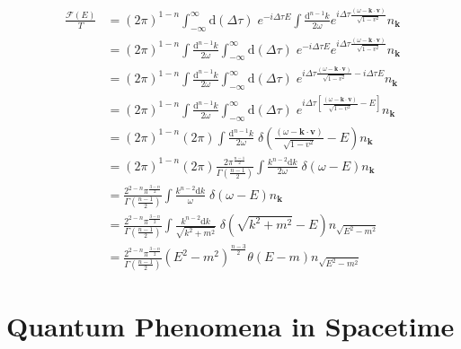 \documentclass[12pt]{article}
\numberwithin{equation}{subsection}
\theoremstyle{mystyle}{\newtheorem{definition}{Definition}[subsection]}
\theoremstyle{mystyle}{\newtheorem{theorem}[definition]{Theorem}}
\theoremstyle{mystyle}{\newtheorem*{remark}{Remark}}
\theoremstyle{mystyle}{\newtheorem{example}{Example}[subsection]}
\theoremstyle{mystyle}{\newtheorem{examples}{Examples}[subsection]}
\theoremstyle{mystyle}{\newtheorem{cthm}{}[subsection]}
\newcommand{\id}{\mathrm{d}}
\begin{document}
\begin{align}
  \frac{\mathcal{F}(E)}{T} & = (2\pi)^{1-n}\int^{\infty}_{-\infty}\id (\Delta \tau)\;e^{-i\Delta\tau E}
  \int\frac{\id^{n-1}k}{2\omega}e^{i\Delta\tau\frac{(\omega-\mathbf{k}\cdot\mathbf{v})}{\sqrt{1-v^2}}}n_{\mathbf{k}}        \\
                 & = (2\pi)^{1-n}\int\frac{\id^{n-1}k}{2\omega}\int^{\infty}_{-\infty}\id (\Delta \tau)\;e^{-i\Delta\tau E}
  e^{i\Delta\tau\frac{(\omega-\mathbf{k}\cdot\mathbf{v})}{\sqrt{1-v^2}}}n_{\mathbf{k}}                                      \\
                 & = (2\pi)^{1-n}\int\frac{\id^{n-1}k}{2\omega}\int^{\infty}_{-\infty}\id (\Delta \tau)\;
  e^{i\Delta\tau\frac{(\omega-\mathbf{k}\cdot\mathbf{v})}{\sqrt{1-v^2}}-i\Delta\tau E}n_{\mathbf{k}}                        \\
                 & = (2\pi)^{1-n}\int\frac{\id^{n-1}k}{2\omega}\int^{\infty}_{-\infty}\id (\Delta \tau)\;
  e^{i\Delta\tau\left[\frac{(\omega-\mathbf{k}\cdot\mathbf{v})}{\sqrt{1-v^2}}-E\right]}n_{\mathbf{k}}                       \\
                 & = (2\pi)^{1-n}(2\pi)\int\frac{\id^{n-1}k}{2\omega}\;
  \delta\left(\frac{(\omega-\mathbf{k}\cdot\mathbf{v})}{\sqrt{1-v^2}}-E\right)n_{\mathbf{k}}                                \\
                 & = (2\pi)^{1-n}(2\pi)\frac{2\pi^{\frac{n-1}{2}}}{\Gamma(\frac{n-1}{2})}\int\frac{k^{n-2}\id k}{2\omega}\;
  \delta\left(\omega-E\right)n_{\mathbf{k}}                                                                                 \\
                 & = \frac{2^{2-n}\pi^{\frac{3-n}{2}}}{\Gamma(\frac{n-1}{2})}\int\frac{k^{n-2}\id k}{\omega}\;
  \delta\left(\omega-E\right)n_{\mathbf{k}}                                                                                 \\
                 & = \frac{2^{2-n}\pi^{\frac{3-n}{2}}}{\Gamma(\frac{n-1}{2})}\int\frac{k^{n-2}\id k}{\sqrt{k^2+m^2}}\;
  \delta\left(\sqrt{k^2+m^2}-E\right)n_{\sqrt{E^2-m^2}}                                                                     \\
                 & = \frac{2^{2-n}\pi^{\frac{3-n}{2}}}{\Gamma(\frac{n-1}{2})}\left(E^2-m^2\right)^{\frac{n-3}{2}}
  \theta\left(E-m\right)n_{\sqrt{E^2-m^2}}
\end{align}




\section{Quantum Phenomena in Spacetime}
\end{document}

